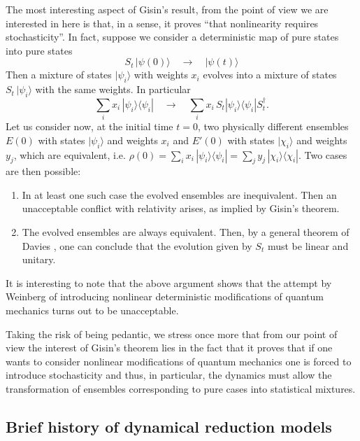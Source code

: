\documentclass[12pt]{article}
\begin{document}
The most interesting aspect of Gisin's result, from the point of
view we are interested in here is that, in a sense, it proves
``that nonlinearity requires stochasticity''. In fact, suppose we
consider a deterministic map of pure states into pure states
\begin{equation}
S_{t}\, |\psi(0)\rangle \quad \longrightarrow \quad
|\psi(t)\rangle
\end{equation}
Then a mixture of states $|\psi_{i}\rangle$ with weights $x_{i}$
evolves into a mixture of states $S_{t}\,|\psi_{i}\rangle$ with
the same weights. In particular
\begin{equation}
\sum_{i} x_{i}\, |\psi_{i}\rangle\langle\psi_{i}| \quad
\longrightarrow \quad \sum_{i} x_{i}\, S_{t}
|\psi_{i}\rangle\langle\psi_{i}| S_{t}^{\dagger}.
\end{equation}
Let us consider now, at the initial time $t=0$, two physically
different ensembles $E(0)$ with states $|\psi_{i}\rangle$ and
weights $x_{i}$ and $E'(0)$ with states $|\chi_{i}\rangle$ and
weights $y_{j}$, which are equivalent, i.e. $\rho(0) = \sum_{i}
x_{i}\, |\psi_{i}\rangle\langle\psi_{i}| = \sum_{j} y_{j}\,
|\chi_{i}\rangle\langle\chi_{i}|$. Two cases are then possible:
\begin{enumerate}
\item In at least one such case the evolved ensembles are
inequivalent. Then an unacceptable conflict with relativity
arises, as implied by Gisin's theorem.
\item The evolved ensembles are always equivalent. Then, by a
general theorem of Davies \cite{dav}, one can conclude that the
evolution given by $S_{t}$ must be linear and unitary.
\end{enumerate}
It is interesting to note that the above argument \cite{gisfl2}
shows that the attempt by Weinberg \cite{weifl} of introducing
nonlinear deterministic modifications of quantum mechanics turns
out to be unacceptable.

Taking the risk of being pedantic, we stress once more that from
our point of view the interest of Gisin's theorem lies in the fact
that it proves that if one wants to consider nonlinear
modifications of quantum mechanics one is forced to introduce
stochasticity and thus, in particular, the dynamics must allow the
transformation of ensembles corresponding to pure cases into
statistical mixtures.


\subsection{Brief history of dynamical reduction models}
\label{sec44}
\end{document}
